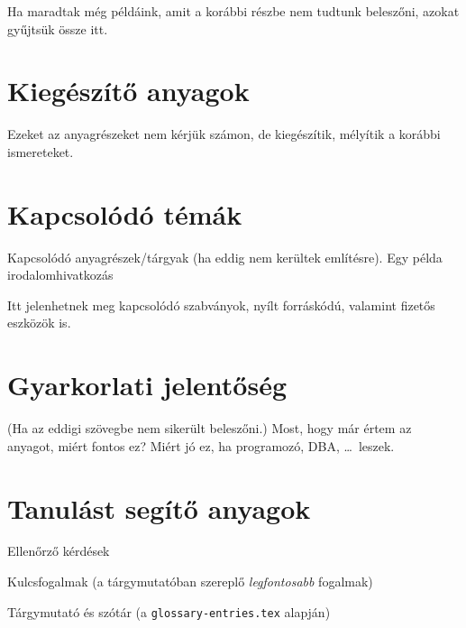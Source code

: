 Ha maradtak még példáink, amit a korábbi részbe nem tudtunk beleszőni, azokat gyűjtsük össze itt.

\section{Kiegészítő anyagok}

Ezeket az anyagrészeket nem kérjük számon, de kiegészítik, mélyítik a korábbi ismereteket.

\section{Kapcsolódó témák}

Kapcsolódó anyagrészek/tárgyak (ha eddig nem kerültek említésre). Egy példa irodalomhivatkozás~\cite{DBLP:books/cs/Ullman88}

Itt jelenhetnek meg kapcsolódó szabványok, nyílt forráskódú, valamint fizetős eszközök is.

\section{Gyarkorlati jelentőség}

(Ha az eddigi szövegbe nem sikerült beleszőni.) Most, hogy már értem az anyagot, miért fontos ez? Miért jó ez, ha programozó, DBA, \ldots\ leszek.

\section{Tanulást segítő anyagok}

Ellenőrző kérdések

Kulcsfogalmak (a tárgymutatóban szereplő \emph{legfontosabb} fogalmak)

Tárgymutató és szótár (a \texttt{glossary-entries.tex} alapján)